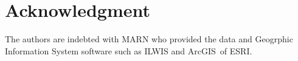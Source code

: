 \documentclass[11pt,twoside]{rmta2010esp}%
\begin{document}
%


\section{Acknowledgment}   
The authors are indebted with MARN who provided the data and Geogrphic Information System software such as ILWIS and ArcGIS\textregistered \  of ESRI.
\end{document}
